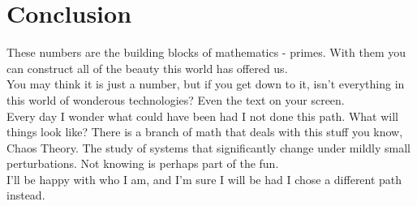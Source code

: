 \documentclass{article}
\begin{document}
\section{Conclusion}
These numbers are the building blocks of mathematics - primes. With them you can construct all of the beauty this world has offered us.\\

You may think it is just a number, but if you get down to it, isn't everything in this world of wonderous technologies? Even the text on your screen.\\

Every day I wonder what could have been had I not done this path. What will things look like? There is a branch of math that deals with this stuff you know, Chaos Theory. The study of systems that significantly change under mildly small perturbations. Not knowing is perhaps part of the fun.\\

I'll be happy with who I am, and I'm sure I will be had I chose a different path instead.\\
\end{document}
